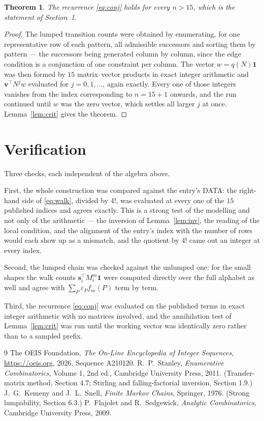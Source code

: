 \documentclass[11pt,a4paper]{article}
\theoremstyle{plain}
\newtheorem{theorem}{Theorem}
\theoremstyle{definition}
\begin{document}
\begin{theorem}
The recurrence \eqref{eq:conj} holds for every $n>15$, which is the statement of
Section~1.
\end{theorem}

\begin{proof}
The lumped transition counts were obtained by enumerating, for one representative row of
each pattern, all admissible successors and sorting them by pattern --- the successors being
generated column by column, since the edge condition is a conjunction of one constraint per
column. The vector $w=q(N)\mathbf{1}$ was then formed by $15$ matrix--vector products
in exact integer arithmetic and $\mathbf{v}^{\!\top}N^{j}w$ evaluated for
$j=0,1,\dots$, again exactly. Every one of those integers vanishes from the index
corresponding to $n=15+1$ onwards, and the run continued until $w$ was the zero vector,
which settles all larger $j$ at once. Lemma~\ref{lem:crit} gives the theorem.
\end{proof}

\section{Verification}

Three checks, each independent of the algebra above.

First, the whole construction was compared against the entry's DATA: the right-hand side of
\eqref{eq:walk}, divided by $4!$, was evaluated at every one of the $15$
published indices and agrees exactly. This is a strong test of the modelling and not only of
the arithmetic --- the inversion of Lemma~\ref{lem:inv}, the reading of the local
condition, and the alignment of the entry's index with the number of rows would each
show up as a mismatch, and the quotient by $4!$ came out an integer at every index.

Second, the lumped chain was checked against the unlumped one: for the small shapes the walk
counts $\mathbf{s}_i^{\!\top}M_i^{m}\mathbf{1}$ were computed directly over the full
alphabet as well and agree with $\sum_P\varepsilon_Pf_m(P)$ term by term.

Third, the recurrence \eqref{eq:conj} was evaluated on the published terms in exact integer
arithmetic with no matrices involved, and the annihilation test of Lemma~\ref{lem:crit} was
run until the working vector was identically zero rather than to a sampled prefix.

\begin{thebibliography}{9}
 The OEIS Foundation, \emph{The On-Line Encyclopedia of Integer
Sequences}, \url{https://oeis.org}, 2026. Sequence A210120.
 R.~P.~Stanley, \emph{Enumerative Combinatorics}, Volume 1, 2nd ed.,
Cambridge University Press, 2011. (Transfer-matrix method, Section 4.7; Stirling and
falling-factorial inversion, Section 1.9.)
 J.~G.~Kemeny and J.~L.~Snell, \emph{Finite Markov Chains}, Springer,
1976. (Strong lumpability, Section 6.3.)
 P.~Flajolet and R.~Sedgewick, \emph{Analytic Combinatorics}, Cambridge
University Press, 2009.
\end{thebibliography}
\end{document}
